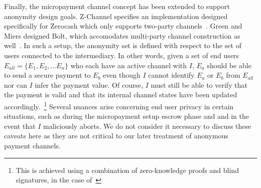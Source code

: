 Finally, the micropayment channel concept has been extended to support anonymity
design goals. Z-Channel specifies an implementation designed specifically for
Zerocash which only supports two-party channels~\cite{zhang2017z}. Green and
Miers designed Bolt, which accomodates multi-party channel construction as
well~\cite{green2017bolt}. In such a setup, the anonymity set is defined with
respect to the set of users connected to the intermediary. In other words, given
a set of end users $E_{all} = \{E_1, E_2, ... E_n\}$ who each have an active
channel with $I$, $E_a$ should be able to send a secure payment to $E_b$ even
though $I$ cannot identify $E_a$ or $E_b$ from $E_{all}$ nor can $I$ infer the
payment value. Of course, $I$ must still be able to verify that the payment is
valid and that its internal channel states have been updated
accordingly.~\footnote{This is achieved using a combination of zero-knowledge
  proofs and blind signatures, in the case of~\cite{green2017bolt}} Several
nuances arise concerning end user privacy in certain situations, such as during
the micropayment setup escrow phase and and in the event that $I$ maliciously
aborts. We do not consider it necessary to discuss these caveats here as they
are not critical to our later treatment of anonymous payment channels.
